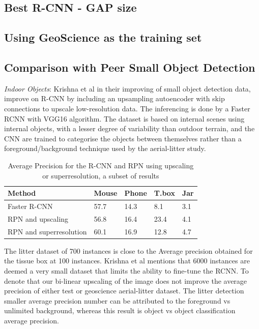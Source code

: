 \documentclass{IEEEtran}
\begin{document}
\subsection{Best R-CNN - GAP size}


\subsection{Using GeoScience as the training set}


\subsection{Comparison with Peer Small Object Detection}

\textit{Indoor Objects}: Krishna et al \cite{Krishna} in their improving of small object detection data, improve on R-CNN by including an upsampling autoencoder with skip connections to upscale low-resolution data. The inferencing is done by a Faster RCNN with VGG16 algorithm. The dataset is based on internal scenes using internal objects, with a lesser degree of variability than outdoor terrain, and the CNN are trained to categorise the objects between themselves rather than a foreground/background technique used by the aerial-litter study.

\begin{table}[h]
\caption{Average Precision for the R-CNN and RPN using upscaling or superresolution, a subset of results}
\centering
\begin{tabular}{lllll}
\hline
\textbf{Method}                         & \textbf{Mouse}            & \textbf{Phone}            & \textbf{T.box}            & \textbf{Jar}             \\ \hline
\multicolumn{1}{|l|}{Faster R-CNN}      & \multicolumn{1}{l|}{57.7} & \multicolumn{1}{l|}{14.3} & \multicolumn{1}{l|}{8.1}  & \multicolumn{1}{l|}{3.1} \\ \hline
\multicolumn{1}{|l|}{RPN and upscaling} & \multicolumn{1}{l|}{56.8} & \multicolumn{1}{l|}{16.4} & \multicolumn{1}{l|}{23.4} & \multicolumn{1}{l|}{4.1} \\ \hline
RPN and superresolution                 & 60.1                      & 16.9                      & 12.8                      & 4.7                      \\ \hline
\end{tabular}
\end{table}

The litter dataset of 700 instances is close to the Average precision obtained for the tissue box at 100 instances. Krishna et al \cite{Krishna} mentions that 6000 instances are deemed a very small dataset that limits the ability to fine-tune the RCNN. To denote that our bi-linear upscaling of the image does not improve the average precision of either test or geoscience aerial-litter dataset. The litter detection smaller average precision number can be attributed to the foreground vs unlimited background, whereas this result is object vs object classification average precision.\newline
\end{document}
